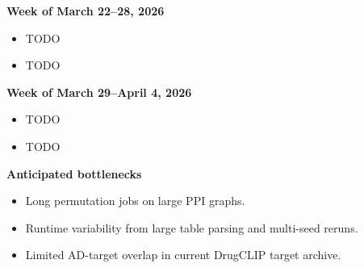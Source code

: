 \documentclass{article}
\begin{document}
\textbf{Week of March 22--28, 2026}
\begin{itemize}
    \item TODO
    \item TODO
\end{itemize}

\textbf{Week of March 29--April 4, 2026}
\begin{itemize}
    \item TODO
    \item TODO
\end{itemize}

\textbf{Anticipated bottlenecks}
\begin{itemize}
    \item Long permutation jobs on large PPI graphs.
    \item Runtime variability from large table parsing and multi-seed reruns.
    \item Limited AD-target overlap in current DrugCLIP target archive.
\end{itemize}



\end{document}
